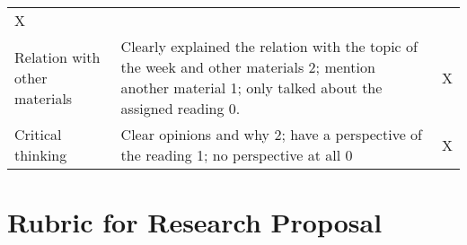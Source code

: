 \documentclass[11pt,]{article}
\theoremstyle{definition}
\theoremstyle{definition}
\theoremstyle{definition}
\theoremstyle{remark}
\begin{document}
\begin{longtable}[]{@{}lll@{}}
\begin{minipage}[t]{0.05\columnwidth}
X\strut
\end{minipage}\tabularnewline
\begin{minipage}[t]{0.15\columnwidth}\raggedright\strut
Relation with other materials\strut
\end{minipage} & \begin{minipage}[t]{0.72\columnwidth}\raggedright\strut
Clearly explained the relation with the topic of the week and other
materials 2; mention another material 1; only talked about the assigned
reading 0.\strut
\end{minipage} & \begin{minipage}[t]{0.05\columnwidth}\raggedright\strut
X\strut
\end{minipage}\tabularnewline
\begin{minipage}[t]{0.15\columnwidth}\raggedright\strut
Critical thinking\strut
\end{minipage} & \begin{minipage}[t]{0.72\columnwidth}\raggedright\strut
Clear opinions and why 2; have a perspective of the reading 1; no
perspective at all 0\strut
\end{minipage} & \begin{minipage}[t]{0.05\columnwidth}\raggedright\strut
X\strut
\end{minipage}\tabularnewline
\bottomrule
\end{longtable}

\clearpage

\hypertarget{id}{\section{Rubric for Research Proposal}\label{id}}
\end{document}

